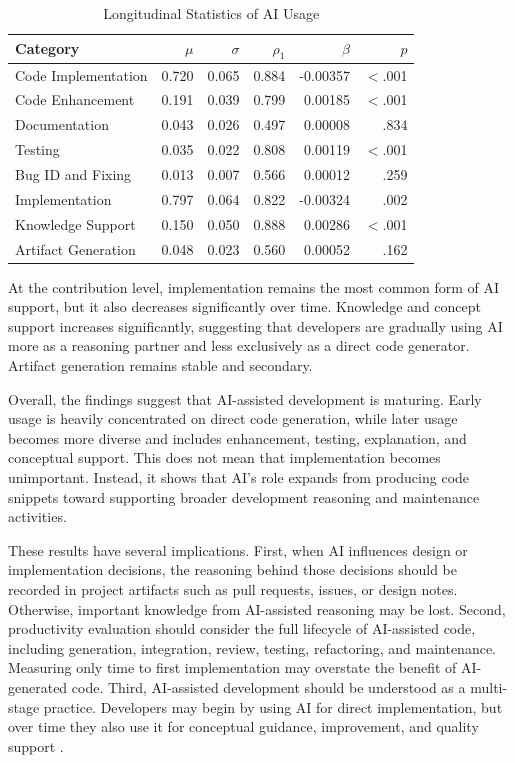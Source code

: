 \documentclass[12pt,draftclsnofoot,onecolumn]{IEEEtran}
\begin{document}
\begin{table}[!t]
\caption{Longitudinal Statistics of AI Usage}
\label{tab:longitudinal}
\centering
\small
\begin{tabularx}{\linewidth}{Xrrrrr}
\toprule
\textbf{Category} & \textbf{$\mu$} & \textbf{$\sigma$} & \textbf{$\rho_1$} & \textbf{$\beta$} & \textbf{$p$} \\
\midrule
Code Implementation & 0.720 & 0.065 & 0.884 & -0.00357 & $<$.001 \\
Code Enhancement & 0.191 & 0.039 & 0.799 & 0.00185 & $<$.001 \\
Documentation & 0.043 & 0.026 & 0.497 & 0.00008 & .834 \\
Testing & 0.035 & 0.022 & 0.808 & 0.00119 & $<$.001 \\
Bug ID and Fixing & 0.013 & 0.007 & 0.566 & 0.00012 & .259 \\
Implementation & 0.797 & 0.064 & 0.822 & -0.00324 & .002 \\
Knowledge Support & 0.150 & 0.050 & 0.888 & 0.00286 & $<$.001 \\
Artifact Generation & 0.048 & 0.023 & 0.560 & 0.00052 & .162 \\
\bottomrule
\end{tabularx}
\end{table}

At the contribution level, implementation remains the most common form of AI support, but it also decreases significantly over time. Knowledge and concept support increases significantly, suggesting that developers are gradually using AI more as a reasoning partner and less exclusively as a direct code generator. Artifact generation remains stable and secondary.

Overall, the findings suggest that AI-assisted development is maturing. Early usage is heavily concentrated on direct code generation, while later usage becomes more diverse and includes enhancement, testing, explanation, and conceptual support. This does not mean that implementation becomes unimportant. Instead, it shows that AI's role expands from producing code snippets toward supporting broader development reasoning and maintenance activities.

These results have several implications. First, when AI influences design or implementation decisions, the reasoning behind those decisions should be recorded in project artifacts such as pull requests, issues, or design notes. Otherwise, important knowledge from AI-assisted reasoning may be lost. Second, productivity evaluation should consider the full lifecycle of AI-assisted code, including generation, integration, review, testing, refactoring, and maintenance. Measuring only time to first implementation may overstate the benefit of AI-generated code. Third, AI-assisted development should be understood as a multi-stage practice. Developers may begin by using AI for direct implementation, but over time they also use it for conceptual guidance, improvement, and quality support \cite{rogers2014diffusion}.
\end{document}
